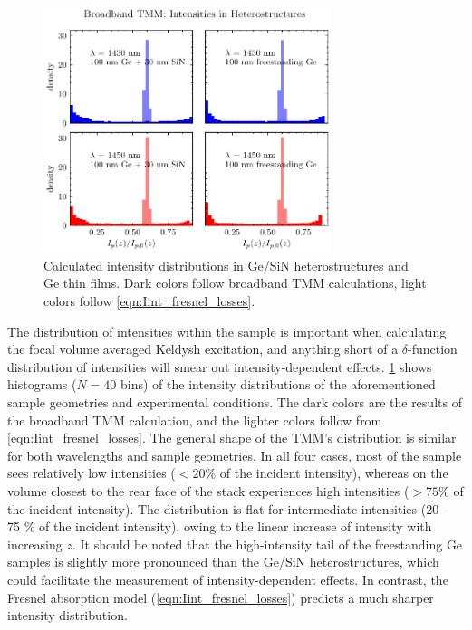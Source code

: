\begin{figure}
	\centering
	\includegraphics[width=0.75\textwidth]{figures/chap4/TMM_hist_chrom_int_2x2.pdf}
	\caption{Calculated intensity distributions in Ge/SiN heterostructures and Ge thin films. Dark colors follow broadband TMM calculations, light colors follow \cref{eqn:Iint_fresnel_losses}.}
	\label{fig:TMM_hist_chrom_int_2x2}
\end{figure}

The distribution of intensities within the sample is important when calculating the focal volume averaged Keldysh excitation, and anything short of a $\delta$-function distribution of intensities will smear out intensity-dependent effects. \cref{fig:TMM_hist_chrom_int_2x2} shows histograms ($N = 40$ bins) of the intensity distributions of the aforementioned sample geometries and experimental conditions. The dark colors are the results of the broadband TMM calculation, and the lighter colors follow from \cref{eqn:Iint_fresnel_losses}. The general shape of the TMM's distribution is similar for both wavelengths and sample geometries. In all four cases, most of the sample sees relatively low intensities ($<20\%$ of the incident intensity), whereas on the volume closest to the rear face of the stack experiences high intensities ($>75\%$ of the incident intensity). The distribution is flat for intermediate intensities ({20 -- 75 \%} of the incident intensity), owing to the linear increase of intensity with increasing $z$. It should be noted that the high-intensity tail of the freestanding Ge samples is slightly more pronounced than the Ge/SiN heterostructures, which could facilitate the measurement of intensity-dependent effects. In contrast, the Fresnel absorption model (\cref{eqn:Iint_fresnel_losses}) predicts a much sharper intensity distribution.

